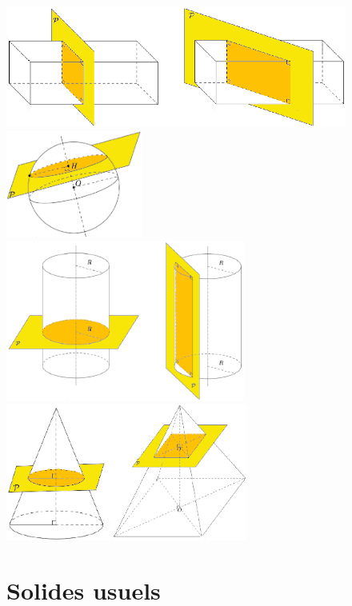 \begin{center}
   \includegraphics[height=4cm]{Geometrie/Images/G12_cours_section_pave} \qquad
   \includegraphics[height=3.5cm]{Geometrie/Images/G12_cours_section_sphere} \\ [5mm]
   \includegraphics[height=5.3cm]{Geometrie/Images/G12_cours_section_cylindre} \qquad
   \includegraphics[height=4.5cm]{Geometrie/Images/G12_cours_section_cone_pyramide}
\end{center}

\pagebreak

\section{Solides usuels} %

